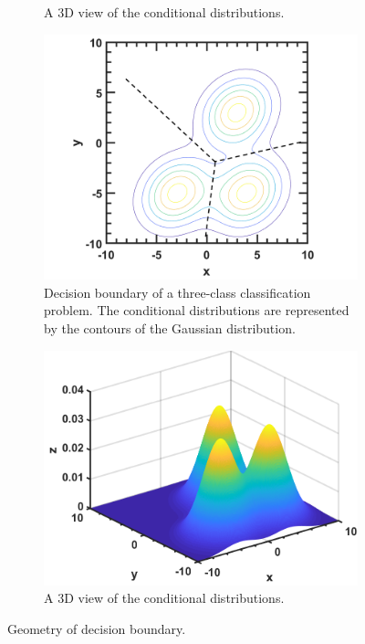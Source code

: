 \begin{refsection}
\begin{figure}[H]
\begin{subfigure}[t]{0.45\textwidth}
		\caption{ A 3D view of the conditional distributions.}
	\end{subfigure}\quad
	\begin{subfigure}[t]{0.45\textwidth}
		\centering
		\includegraphics[width=1\linewidth]{../figures/statisticalLearning/linearModelClassification/linearGaussianDiscriminateDecisionBoundaryDemo2DTwoOverlay}
		\caption{Decision boundary of a three-class classification problem. The conditional distributions are represented by the contours of the Gaussian distribution.}
	\end{subfigure}\quad
	\begin{subfigure}[t]{0.45\textwidth}
		\centering
		\includegraphics[width=1\linewidth]{../figures/statisticalLearning/linearModelClassification/linearGaussianDiscriminateDecisionBoundaryDemo3DTwo}
		\caption{A 3D view of the conditional distributions.}
	\end{subfigure}
	\caption{Geometry of decision boundary.}
	\label{fig:linearGaussianDiscriminateModeDecisionBoundaryDemo}
\end{figure}



\end{refsection}
